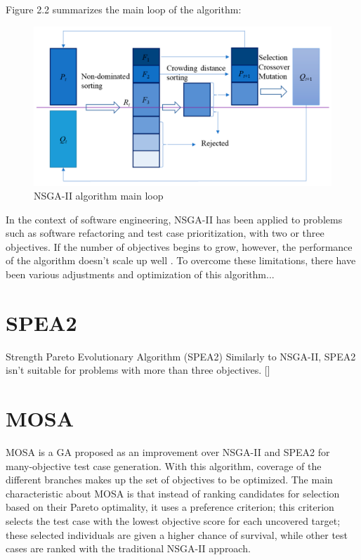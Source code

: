 Figure 2.2 summarizes the main loop of the algorithm:
\begin{figure}[!h]
    \centering
    \includegraphics[scale=0.1]{./figures/nsga-ii.png}
    \caption{NSGA-II algorithm main loop}
    \label{fig:NSGA-II algorithm main loop}
\end{figure}


In the context of software engineering, NSGA-II has been applied to problems such as software refactoring and test case prioritization,
with two or three objectives. If the number of objectives begins to grow, however, the performance of the algorithm doesn't scale up well \cite{DBLP:journals/csur/LiLTY15}.
To overcome these limitations, there have been various adjustments and optimization of this algorithm...








\section{SPEA2}
Strength Pareto Evolutionary Algorithm (SPEA2)
Similarly to NSGA-II, SPEA2 isn't suitable for problems with more than three objectives. []





\section{MOSA}
MOSA \cite{DBLP:conf/icst/PanichellaKT15} is a GA proposed as an improvement over NSGA-II and SPEA2 for many-objective test case generation. With this algorithm, coverage of the different branches makes up the set of objectives to be optimized. The main characteristic about MOSA is that instead of ranking candidates for selection based on their Pareto optimality, it uses a preference criterion; this criterion selects the test case with the lowest objective score for each uncovered target; these selected individuals are given a higher chance of survival, while other test cases are ranked with the traditional NSGA-II approach.


